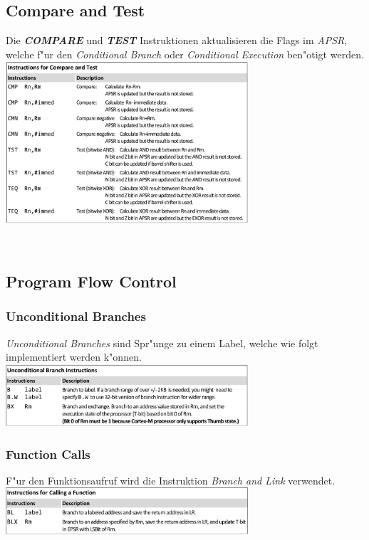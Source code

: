 \begin{minipage}[t]{9cm}
	\subsection{Compare and Test}
	Die \textit{\textbf{COMPARE}} und \textit{\textbf{TEST}} Instruktionen aktualisieren die Flags im \textit{APSR}, welche f"ur den \textit{Conditional Branch} oder \textit{Conditional Execution} ben"otigt werden.\\

	\includegraphics[width=9cm]{images/compare-and-test}

\end{minipage}
%
\begin{minipage}[t]{0.5cm}
	\-\
\end{minipage}
%
\begin{minipage}[t]{9cm}
	\subsection{Program Flow Control}
	\subsubsection{Unconditional Branches}
	\textit{Unconditional Branches} sind Spr"unge zu einem Label, welche wie folgt implementiert werden k"onnen.\\
	
	\includegraphics[width=9cm]{images/branches}
	
	\subsubsection{Function Calls}
	F"ur den Funktionsaufruf wird die Instruktion \textit{Branch and Link} verwendet.\\
	
	\includegraphics[width=9cm]{images/Function_call}
\end{minipage}


